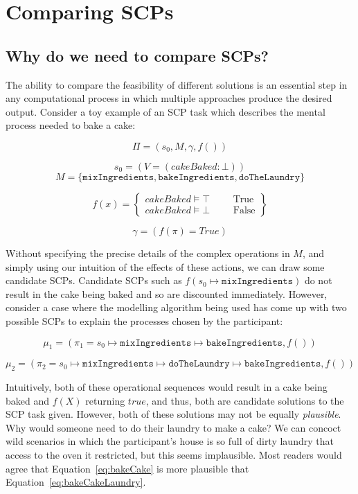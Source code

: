 \chapter{Comparing SCPs} \label{chp:comparing}
\section{Why do we need to compare SCPs?} \label{sec:whyCompare}
The ability to compare the feasibility of different solutions is an essential step in any computational process in which multiple approaches produce the desired output. Consider a toy example of an SCP task which describes the mental process needed to bake a cake:

\[
\Pi = (s_0, M, \gamma, f())
\]

\[
s_0 = (V=(cakeBaked: \bot) )
\]
\[
M=\{\texttt{mixIngredients}, \texttt{bakeIngredients}, \texttt{doTheLaundry}\}
\]

\[
f(x)= \left\{ \begin{split} cakeBaked \models \top & & & \textrm{True}\\ cakeBaked \models \bot & & & \textrm{False} \end{split} \right\}
\]

\[
\gamma = (f(\pi) = True)
\]

Without specifying the precise details of the complex operations in $M$, and simply using our intuition of the effects of these actions, we can draw some candidate SCPs. Candidate SCPs such as $f(s_0 \longmapsto \texttt{mixIngredients})$ do not result in the cake being baked and so are discounted immediately. However, consider a case where the modelling algorithm being used has come up with two possible SCPs to explain the processes chosen by the participant:

\begin{equation} \label{eq:bakeCake}
\mu_1 = (\pi_1=s_0\longmapsto \texttt{mixIngredients} \longmapsto \texttt{bakeIngredients},f())
\end{equation}

\begin{equation} \label{eq:bakeCakeLaundry}
\mu_2 = (\pi_2 = s_0 \longmapsto \texttt{mixIngredients} \longmapsto  \texttt{doTheLaundry} \longmapsto \texttt{bakeIngredients},f())
\end{equation}

Intuitively, both of these operational sequences would result in a cake being baked and $f(X)$ returning $true$, and thus, both are candidate solutions to the SCP task given. However, both of these solutions may not be equally \textit{plausible}. Why would someone need to do their laundry to make a cake? We can concoct wild scenarios in which the participant's house is so full of dirty laundry that access to the oven it restricted, but this seems implausible. Most readers would agree that Equation~\ref{eq:bakeCake} is more plausible that Equation~\ref{eq:bakeCakeLaundry}.

